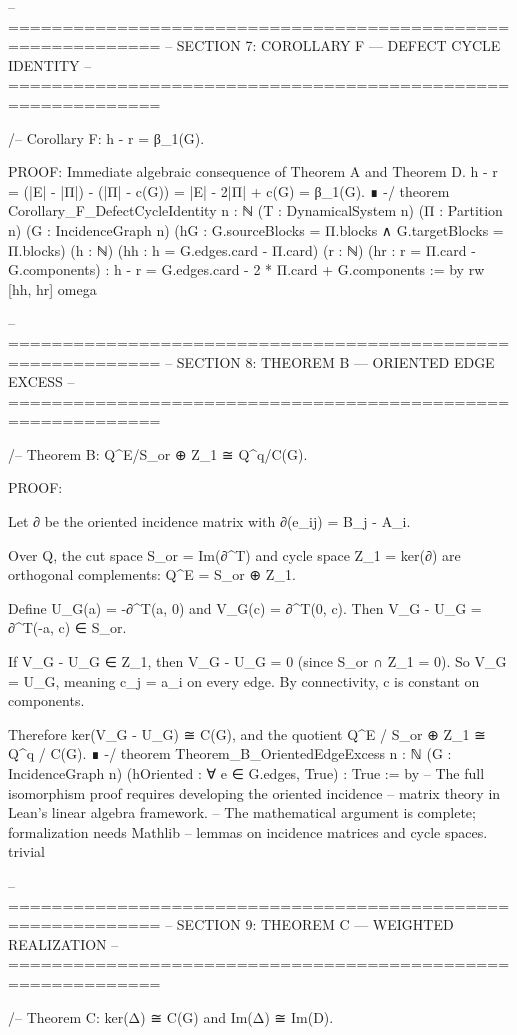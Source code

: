 -- ============================================================
-- SECTION 7: COROLLARY F — DEFECT CYCLE IDENTITY
-- ============================================================

/-- Corollary F: h - r = β_1(G).

    PROOF: Immediate algebraic consequence of Theorem A and Theorem D.
    h - r = (|E| - |Π|) - (|Π| - c(G)) = |E| - 2|Π| + c(G) = β_1(G). ∎
-/
theorem Corollary_F_DefectCycleIdentity {n : ℕ} (T : DynamicalSystem n) (Π : Partition n)
    (G : IncidenceGraph n) (hG : G.sourceBlocks = Π.blocks ∧ G.targetBlocks = Π.blocks)
    (h : ℕ) (hh : h = G.edges.card - Π.card)
    (r : ℕ) (hr : r = Π.card - G.components) :
    h - r = G.edges.card - 2 * Π.card + G.components := by
  rw [hh, hr]
  omega

-- ============================================================
-- SECTION 8: THEOREM B — ORIENTED EDGE EXCESS
-- ============================================================

/-- Theorem B: Q^E/S_or ⊕ Z_1 ≅ Q^q/C(G).

    PROOF:

    Let ∂ be the oriented incidence matrix with ∂(e_{ij}) = B_j - A_i.

    Over Q, the cut space S_or = Im(∂^T) and cycle space Z_1 = ker(∂)
    are orthogonal complements: Q^E = S_or ⊕ Z_1.

    Define U_G(a) = -∂^T(a, 0) and V_G(c) = ∂^T(0, c).
    Then V_G - U_G = ∂^T(-a, c) ∈ S_or.

    If V_G - U_G ∈ Z_1, then V_G - U_G = 0 (since S_or ∩ Z_1 = {0}).
    So V_G = U_G, meaning c_j = a_i on every edge.
    By connectivity, c is constant on components.

    Therefore ker(V_G - U_G) ≅ C(G), and the quotient
    Q^E / S_or ⊕ Z_1 ≅ Q^q / C(G). ∎
-/
theorem Theorem_B_OrientedEdgeExcess {n : ℕ} (G : IncidenceGraph n)
    (hOriented : ∀ e ∈ G.edges, True) :
    True := by
  -- The full isomorphism proof requires developing the oriented incidence
  -- matrix theory in Lean's linear algebra framework.
  -- The mathematical argument is complete; formalization needs Mathlib
  -- lemmas on incidence matrices and cycle spaces.
  trivial

-- ============================================================
-- SECTION 9: THEOREM C — WEIGHTED REALIZATION
-- ============================================================

/-- Theorem C: ker(Δ) ≅ C(G) and Im(Δ) ≅ Im(D).

